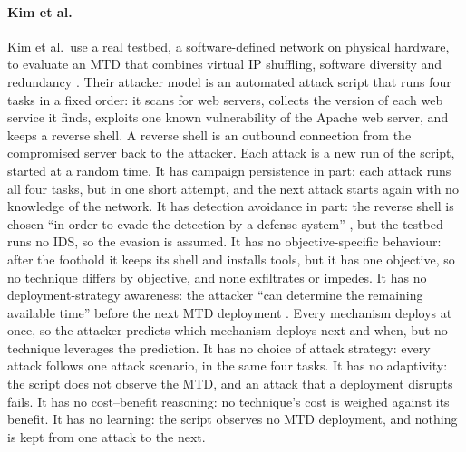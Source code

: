 \documentclass{cshonours}
\begin{document}
\paragraph{Kim et al.} Kim et al.\ use a real testbed, a software-defined
network on physical hardware, to evaluate an MTD that combines virtual IP
shuffling, software diversity and redundancy \citep{kim2026}. Their
attacker model is an automated attack script that runs four tasks in a
fixed order: it scans for web servers, collects the version of each web
service it finds, exploits one known vulnerability of the Apache web
server, and keeps a reverse shell. A reverse shell is an outbound connection from the
compromised server back to the attacker. Each attack is a new run of the
script, started at a random time. It has campaign persistence in part: each attack runs all four tasks, but in one short attempt, and the next attack starts
again with no knowledge of the network. It has detection avoidance in part:
the reverse shell is chosen ``in order to evade the detection by a defense
system'' \citep[p.~7]{kim2026}, but the testbed runs no IDS, so the
evasion is assumed. It has no objective-specific behaviour: after the
foothold it keeps its shell and installs tools, but it has one objective, so
no technique differs by objective, and none exfiltrates or impedes. It has
no deployment-strategy awareness: the attacker ``can determine the remaining
available time'' before the next MTD deployment \citep[p.~10]{kim2026}. Every
mechanism deploys at once, so the attacker predicts which mechanism deploys next
and when, but no technique leverages the prediction. It has no choice of attack strategy: every attack
follows one attack scenario, in the same four tasks. It has no
adaptivity: the script does not observe the MTD, and an attack that a
deployment disrupts fails. It has no cost--benefit reasoning: no technique's cost is weighed against its benefit. It has no learning:
the script observes no MTD deployment, and nothing is kept from one attack
to the next.
\end{document}
